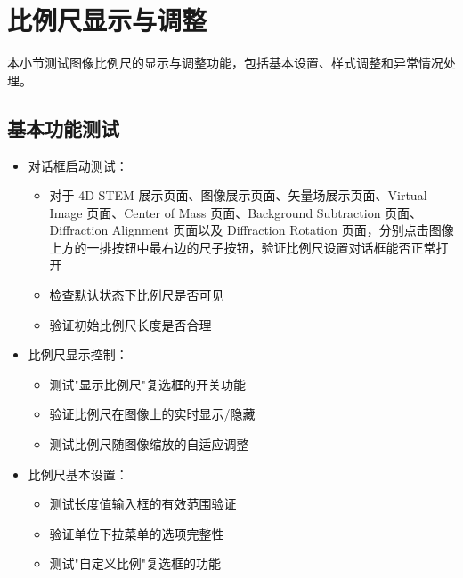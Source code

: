 \documentclass[a4paper,12pt]{report}	%
\begin{document}
\section{比例尺显示与调整}

本小节测试图像比例尺的显示与调整功能，包括基本设置、样式调整和异常情况处理。

\subsection{基本功能测试}
\begin{itemize}
    \item 对话框启动测试：
    \begin{itemize}
        \item 对于 4D-STEM 展示页面、图像展示页面、矢量场展示页面、Virtual Image 页面、Center of Mass 页面、Background Subtraction 页面、Diffraction Alignment 页面以及 Diffraction Rotation 页面，分别点击图像上方的一排按钮中最右边的尺子按钮，验证比例尺设置对话框能否正常打开
        \item 检查默认状态下比例尺是否可见
        \item 验证初始比例尺长度是否合理
    \end{itemize}
    
    \item 比例尺显示控制：
    \begin{itemize}
        \item 测试"显示比例尺"复选框的开关功能
        \item 验证比例尺在图像上的实时显示/隐藏
        \item 测试比例尺随图像缩放的自适应调整
    \end{itemize}
    
    \item 比例尺基本设置：
    \begin{itemize}
        \item 测试长度值输入框的有效范围验证
        \item 验证单位下拉菜单的选项完整性
        \item 测试"自定义比例"复选框的功能
    \end{itemize}
\end{itemize}
\end{document}
